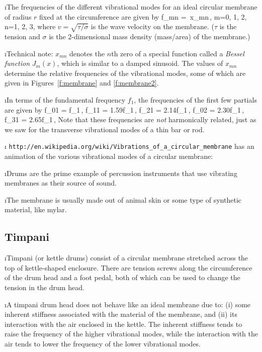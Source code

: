 \i The frequencies of the different vibrational
modes for an ideal circular membrane of radius $r$
fixed at the circumference are given by
%
\be
f_{mn} = \,x_{mn}\,,
\quad m=0, 1, 2, \cdots
\quad n=1, 2, 3, \cdots
\ee
%
where $v=\sqrt{\tau/\sigma}$ is the wave velocity
on the membrane.
($\tau$ is the tension and $\sigma$ is the 2-dimensional
mass density (mass/area) of the membrane.)

\i Technical note:
$x_{mn}$ denotes the $n$th zero of a special 
function called a {\em Bessel function} $J_m(x)$,
which is similar to a damped sinusoid.
The values of $x_{mn}$ determine the relative
frequencies of the vibrational modes, some of
which are given in Figures~\ref{f:membrane}
and \ref{f:membrane2}.

\i In terms of the fundamental frequency $f_1$, the
frequencies of the first few partials are given by
%
\be
f_{01} = f_1\,,\quad 
f_{11} = 1.59f_1\,,\quad 
f_{21} = 2.14f_1\,,\quad
f_{02} = 2.30f_1\,,\quad
f_{31} = 2.65f_1\,,\quad
\cdots
\ee
%
Note that these frequencies are {\em not} harmonically
related, just as we saw for the transverse vibrational
modes of a thin bar or rod.

\i \demo 
{\tt http://en.wikipedia.org/wiki/Vibrations\_of\_a\_circular\_membrane}
has an animation of the various vibrational modes of a circular membrane: 

\i Drums are the prime example of percussion instruments 
that use vibrating membranes as their source of sound.

\i The membrane is usually made out of animal skin or
some type of synthetic material, like mylar.

\ei
\subsection{Timpani}
\bi

\i Timpani (or kettle drums) consist of a circular membrane
stretched across the top of kettle-shaped enclosure.
There are tension screws along the circumference of the 
drum head and a foot pedal, both of which can be used to 
change the tension in the drum head.

\i A timpani drum head does not behave like an ideal 
membrane due to: (i) some inherent stiffness associated with the 
material of the membrane, and (ii) its interaction with the air 
enclosed in the kettle.
The inherent stiffness tends to raise the frequency 
of the higher vibrational modes, while the interaction with the air
tends to lower the frequency of the lower vibrational modes.

